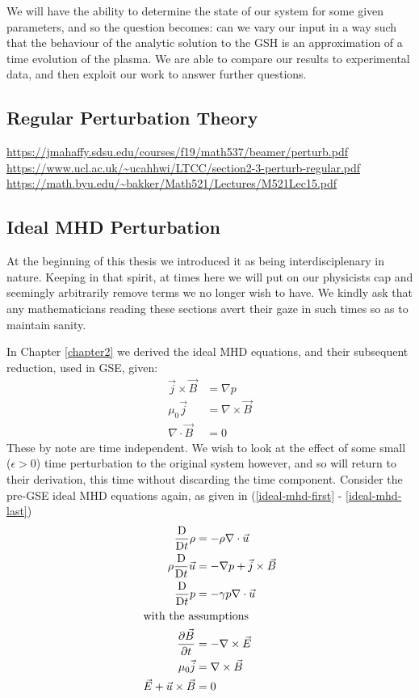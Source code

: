 We will have the ability to determine the 
state of our system for some given parameters, and so the question becomes: can 
we vary our input in a way such that the behaviour of the analytic solution to 
the GSH is an approximation of a time evolution of the plasma. We are able to compare 
our results to experimental data, and then exploit our work to answer further questions.



\subsection{Regular Perturbation Theory}


\url{https://jmahaffy.sdsu.edu/courses/f19/math537/beamer/perturb.pdf}
\url{https://www.ucl.ac.uk/~ucahhwi/LTCC/section2-3-perturb-regular.pdf}
\url{https://math.byu.edu/~bakker/Math521/Lectures/M521Lec15.pdf}

\subsection{Ideal MHD Perturbation}

At the beginning of this thesis we introduced it as being interdisciplenary in nature. 
Keeping in that spirit, at times here we will put on our physicists cap and 
seemingly arbitrarily remove terms we no longer wish to have. We 
kindly ask that any mathematicians reading these sections avert their gaze in such 
times so as to maintain sanity.

In Chapter \ref{chapter2} we derived the ideal MHD equations, and their subsequent reduction, used in GSE, given:
\begin{align}
    \vec{j} \times \vec{B} &= \nabla p \\
    \mu_0 \vec{j} &= \nabla \times \vec{B} \\
    \nabla \cdot \vec{B} &= 0
\end{align}
These by note are time independent. We wish to look at the 
effect of some small ($\epsilon > 0$) time perturbation to the original system however, and so 
will return to their derivation, this time without discarding the time component. Consider the pre-GSE ideal MHD equations again, 
as given in (\eqref{ideal-mhd-first} - \eqref{ideal-mhd-last})
\begin{align*}
    \frac{\text{D}}{\text{D} t} \rho &= -\rho \nabla \cdot \vec{u} \\
    \rho \frac{\text{D}}{\text{D} t} \vec{u} &= -\nabla p + \vec{j} \times \vec{B}\\
    \frac{\text{D}}{\text{D} t} p  &= -\gamma p \nabla \cdot \vec{u} \\
    \shortintertext{with the assumptions}
    \pdv{\vec{B}}{t} &= -\nabla \times \vec{E} \\
    \mu_0 \vec{j} &= \nabla \times \vec{B} \\
    \vec{E} + \vec{u} \times \vec{B} &= 0 
\end{align*}

